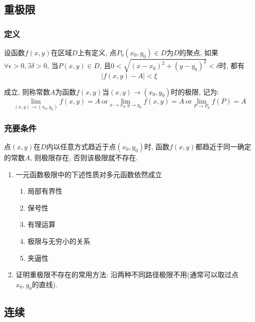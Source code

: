 \subsection{重极限}
\subsubsection{定义}
设函数$ f(x,y) $在区域$ D $上有定义, 点$ P_{0}(x_{0}, y_{0})\in D $为$ D $的聚点, 如果$ \forall \epsilon>0, \exists \delta>0 $, 当$ P(x,y)\in D $, 且$ 0<\sqrt{(x-x_{0})^{2}+(y-y_{0})^{2}}<\delta $时, 都有
\begin{equation*}
    |f(x,y)-A|<\xi
\end{equation*}\par
成立, 则称常数$ A $为函数$ f(x,y) $当$ (x,y)\rightarrow (x_{0},y_{0}) $时的极限, 记为:
\begin{equation*}
    \lim\limits_{(x,y) \rightarrow (x_{0},y_{0})}f(x,y)=A\ \mathrm{or} \lim\limits_{x \rightarrow x_{0}, y \rightarrow y_{0}}f(x,y)=A\ \mathrm{or} \lim\limits_{P \rightarrow P_{0}}f(P)=A
\end{equation*}
\subsubsection{充要条件}
点$ (x,y) $在$ D $内以任意方式趋近于点$ (x_{0},y_{0}) $时, 函数$ f(x,y) $都趋近于同一确定的常数$ A $, 则极限存在, 否则该极限就不存在.
\begin{tcolorbox}
    \begin{enumerate}
        \item 一元函数极限中的下述性质对多元函数依然成立
              \begin{enumerate}
                  \item 局部有界性
                  \item 保号性
                  \item 有理运算
                  \item 极限与无穷小的关系
                  \item 夹逼性
              \end{enumerate}
        \item 证明重极限不存在的常用方法: 沿两种不同路径极限不用(通常可以取过点$ x_{0},y_{0} $的直线).
    \end{enumerate}
\end{tcolorbox}
\subsection{连续}

